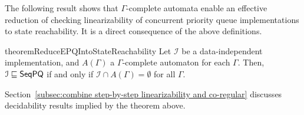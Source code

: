 The following result shows that $\Gamma$-complete automata enable an effective reduction of checking linearizability of concurrent priority queue implementations to state reachability. It is a direct consequence of the above definitions.

\begin{restatable}{theorem}{ReduceEPQIntoStateReachability}
\label{lemma:reduce EPQ into state reachability}
Let $\mathcal{I}$ be a data-independent implementation, and $A(\Gamma)$ a $\Gamma$-complete automaton for each $\Gamma$. Then,
$\mathcal{I} \sqsubseteq \mathsf{SeqPQ}$ if and only if $\mathcal{I} \cap A(\Gamma) = \emptyset$ for all $\Gamma$.
\end{restatable}

Section~\ref{subsec:combine step-by-step linearizability and co-regular} discusses decidability results implied by the theorem above.




%
%
%
%
%
%
%
%
%
%
%
%
%
%



